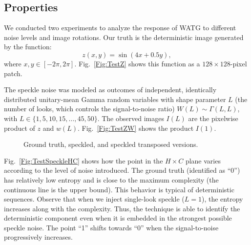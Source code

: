 \documentclass[journal]{IEEEtran}
\begin{document}
\subsection{Properties}\label{Sec:WATGProperties}

We conducted two experiments to analyze the response of WATG to different noise levels and image rotations.
Our truth is the deterministic image generated by the function:
\begin{equation*}
z(x,y) = \sin (4x + 0.5y), 
\end{equation*}
where  $x, y \in [-2\pi, 2\pi]$.
Fig.~\ref{Fig:TestZ} shows this function as a $128\times128$-pixel patch.

The speckle noise was modeled as outcomes of independent, identically distributed unitary-mean Gamma random variables with shape parameter $L$ (the number of looks, which controls the signal-to-noise ratio)
$W(L) \sim \Gamma(L, L)$,
with $L \in \{1, 5, 10, 15, \dots, 45, 50\}$.
The observed images $I(L)$ are the pixelwise product of $z$ and $w(L)$.
Fig.~\ref{Fig:TestZW} shows the product $I(1)$.

\begin{figure}
	\centering
	\caption{Ground truth, speckled, and speckled transposed versions.}
	\label{Fig:TestZWL}
\end{figure}

Fig.~\ref{Fig:TestSpeckleHC} shows how the point in the $H\times C$ plane varies according to the level of noise introduced.
The ground truth (identified as ``\textsf{0}'') has relatively low entropy and is close to the maximum complexity (the continuous line is the upper bound).
This behavior is typical of deterministic sequences.
Observe that when we inject single-look speckle ($L=1$), the entropy increases along with the complexity.
Thus, the technique is able to identify the deterministic component even when it is embedded in the strongest possible speckle noise.
The point ``\textsf{1}'' shifts towards ``\textsf{0}'' when the signal-to-noise progressively increases.
\end{document}
